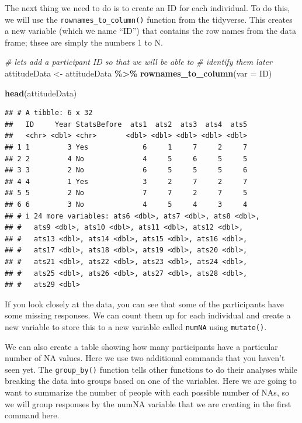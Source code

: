 \documentclass[
  12pt,
]{book}
\newenvironment{Shaded}{\begin{snugshade}}{\end{snugshade}}
\newcommand{\AttributeTok}[1]{\textcolor[rgb]{0.13,0.29,0.53}{#1}}
\newcommand{\CommentTok}[1]{\textcolor[rgb]{0.56,0.35,0.01}{\textit{#1}}}
\newcommand{\FunctionTok}[1]{\textcolor[rgb]{0.13,0.29,0.53}{\textbf{#1}}}
\newcommand{\NormalTok}[1]{#1}
\newcommand{\OtherTok}[1]{\textcolor[rgb]{0.56,0.35,0.01}{#1}}
\newcommand{\SpecialCharTok}[1]{\textcolor[rgb]{0.81,0.36,0.00}{\textbf{#1}}}
\newcommand{\StringTok}[1]{\textcolor[rgb]{0.31,0.60,0.02}{#1}}
\begin{document}
The next thing we need to do is to create an ID for each individual. To do this, we will use the \texttt{rownames\_to\_column()} function from the tidyverse. This creates a new variable (which we name ``ID'') that contains the row names from the data frame; thsee are simply the numbers 1 to N.

\begin{Shaded}
\begin{Highlighting}[]
\CommentTok{\# let\textquotesingle{}s add a participant ID so that we will be able to }
\CommentTok{\# identify them later}
\NormalTok{attitudeData }\OtherTok{\textless{}{-}} 
\NormalTok{  attitudeData }\SpecialCharTok{\%\textgreater{}\%} 
  \FunctionTok{rownames\_to\_column}\NormalTok{(}\AttributeTok{var =} \StringTok{\textquotesingle{}ID\textquotesingle{}}\NormalTok{)}

\FunctionTok{head}\NormalTok{(attitudeData)}
\end{Highlighting}
\end{Shaded}

\begin{verbatim}
## # A tibble: 6 x 32
##   ID     Year StatsBefore  ats1  ats2  ats3  ats4  ats5
##   <chr> <dbl> <chr>       <dbl> <dbl> <dbl> <dbl> <dbl>
## 1 1         3 Yes             6     1     7     2     7
## 2 2         4 No              4     5     6     5     5
## 3 3         2 No              6     5     5     5     6
## 4 4         1 Yes             3     2     7     2     7
## 5 5         2 No              7     7     2     7     5
## 6 6         3 No              4     5     4     3     4
## # i 24 more variables: ats6 <dbl>, ats7 <dbl>, ats8 <dbl>,
## #   ats9 <dbl>, ats10 <dbl>, ats11 <dbl>, ats12 <dbl>,
## #   ats13 <dbl>, ats14 <dbl>, ats15 <dbl>, ats16 <dbl>,
## #   ats17 <dbl>, ats18 <dbl>, ats19 <dbl>, ats20 <dbl>,
## #   ats21 <dbl>, ats22 <dbl>, ats23 <dbl>, ats24 <dbl>,
## #   ats25 <dbl>, ats26 <dbl>, ats27 <dbl>, ats28 <dbl>,
## #   ats29 <dbl>
\end{verbatim}

If you look closely at the data, you can see that some of the participants have some missing responses. We can count them up for each individual and create a new variable to store this to a new variable called \texttt{numNA} using \texttt{mutate()}.

We can also create a table showing how many participants have a particular number of NA values. Here we use two additional commands that you haven't seen yet. The \texttt{group\_by()} function tells other functions to do their analyses while breaking the data into groups based on one of the variables. Here we are going to want to summarize the number of people with each possible number of NAs, so we will group responses by the numNA variable that we are creating in the first command here.
\end{document}
